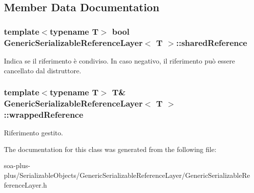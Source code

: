 \subsection{Member Data Documentation}
\hypertarget{class_generic_serializable_reference_layer_ac27eb631cf3a02ab76c8ffee0c62fe05}{
\subsubsection[{sharedReference}]{\setlength{\rightskip}{0pt plus 5cm}template$<$typename T$>$ bool {\bf GenericSerializableReferenceLayer}$<$ T $>$::{\bf sharedReference}}}
\label{class_generic_serializable_reference_layer_ac27eb631cf3a02ab76c8ffee0c62fe05}
Indica se il riferimento è condiviso. In caso negativo, il riferimento può essere cancellato dal distruttore. \hypertarget{class_generic_serializable_reference_layer_a7d3c38c131eec2f749565fe837964d38}{
\subsubsection[{wrappedReference}]{\setlength{\rightskip}{0pt plus 5cm}template$<$typename T$>$ T\& {\bf GenericSerializableReferenceLayer}$<$ T $>$::{\bf wrappedReference}}}
\label{class_generic_serializable_reference_layer_a7d3c38c131eec2f749565fe837964d38}
Riferimento gestito. 

The documentation for this class was generated from the following file:\begin{DoxyCompactItemize}
\item 
soa-\/plus-\/plus/SerializableObjects/GenericSerializableReferenceLayer/GenericSerializableReferenceLayer.h\end{DoxyCompactItemize}
